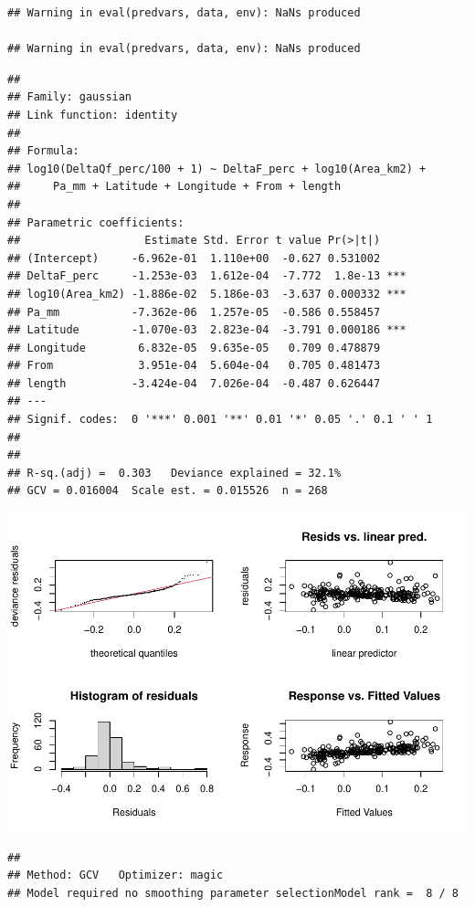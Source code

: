 \documentclass[]{elsarticle} %
\begin{document}
\begin{verbatim}
## Warning in eval(predvars, data, env): NaNs produced

## Warning in eval(predvars, data, env): NaNs produced
\end{verbatim}

\begin{verbatim}
## 
## Family: gaussian 
## Link function: identity 
## 
## Formula:
## log10(DeltaQf_perc/100 + 1) ~ DeltaF_perc + log10(Area_km2) + 
##     Pa_mm + Latitude + Longitude + From + length
## 
## Parametric coefficients:
##                   Estimate Std. Error t value Pr(>|t|)    
## (Intercept)     -6.962e-01  1.110e+00  -0.627 0.531002    
## DeltaF_perc     -1.253e-03  1.612e-04  -7.772  1.8e-13 ***
## log10(Area_km2) -1.886e-02  5.186e-03  -3.637 0.000332 ***
## Pa_mm           -7.362e-06  1.257e-05  -0.586 0.558457    
## Latitude        -1.070e-03  2.823e-04  -3.791 0.000186 ***
## Longitude        6.832e-05  9.635e-05   0.709 0.478879    
## From             3.951e-04  5.604e-04   0.705 0.481473    
## length          -3.424e-04  7.026e-04  -0.487 0.626447    
## ---
## Signif. codes:  0 '***' 0.001 '**' 0.01 '*' 0.05 '.' 0.1 ' ' 1
## 
## 
## R-sq.(adj) =  0.303   Deviance explained = 32.1%
## GCV = 0.016004  Scale est. = 0.015526  n = 268
\end{verbatim}

\includegraphics{Forest_and_Water_files/figure-latex/model2a1-1.pdf}

\begin{verbatim}
## 
## Method: GCV   Optimizer: magic
## Model required no smoothing parameter selectionModel rank =  8 / 8
\end{verbatim}
\end{document}
